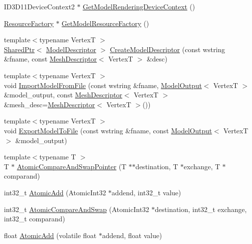 \begin{DoxyCompactItemize}
\item 
I\+D3\+D11\+Device\+Context2 $\ast$ \hyperlink{namespacemage_a1d373a08e09ec19944bf23feb4688b7e}{Get\+Model\+Rendering\+Device\+Context} ()
\item 
\hyperlink{classmage_1_1_resource_factory}{Resource\+Factory} $\ast$ \hyperlink{namespacemage_a51b4df46661a9038c0d2a14cb3fbe483}{Get\+Model\+Resource\+Factory} ()
\item 
{\footnotesize template$<$typename VertexT $>$ }\\\hyperlink{namespacemage_a1e01ae66713838a7a67d30e44c67703e}{Shared\+Ptr}$<$ \hyperlink{classmage_1_1_model_descriptor}{Model\+Descriptor} $>$ \hyperlink{namespacemage_a8cc26f80d3cb6f3d457bb06942880d84}{Create\+Model\+Descriptor} (const wstring \&fname, const \hyperlink{structmage_1_1_mesh_descriptor}{Mesh\+Descriptor}$<$ VertexT $>$ \&desc)
\item 
{\footnotesize template$<$typename VertexT $>$ }\\void \hyperlink{namespacemage_a3b43f166d61c14d680b28614da17ac2b}{Import\+Model\+From\+File} (const wstring \&fname, \hyperlink{structmage_1_1_model_output}{Model\+Output}$<$ VertexT $>$ \&model\+\_\+output, const \hyperlink{structmage_1_1_mesh_descriptor}{Mesh\+Descriptor}$<$ VertexT $>$ \&mesh\+\_\+desc=\hyperlink{structmage_1_1_mesh_descriptor}{Mesh\+Descriptor}$<$ VertexT $>$())
\item 
{\footnotesize template$<$typename VertexT $>$ }\\void \hyperlink{namespacemage_a3cb120c707ba8db950082a33d76b3ec8}{Export\+Model\+To\+File} (const wstring \&fname, const \hyperlink{structmage_1_1_model_output}{Model\+Output}$<$ VertexT $>$ \&model\+\_\+output)
\item 
{\footnotesize template$<$typename T $>$ }\\T $\ast$ \hyperlink{namespacemage_aed89242e67231f3ddef77bdc63b32b6c}{Atomic\+Compare\+And\+Swap\+Pointer} (T $\ast$$\ast$destination, T $\ast$exchange, T $\ast$comparand)
\item 
int32\+\_\+t \hyperlink{namespacemage_ad397e742fa7e3532686fd46bb50e8166}{Atomic\+Add} (Atomic\+Int32 $\ast$addend, int32\+\_\+t value)
\item 
int32\+\_\+t \hyperlink{namespacemage_a03da57cfa5ba14d4aa0472ae49ec5c7e}{Atomic\+Compare\+And\+Swap} (Atomic\+Int32 $\ast$destination, int32\+\_\+t exchange, int32\+\_\+t comparand)
\item 
float \hyperlink{namespacemage_a0de5ff6241a0474f4572c7c3ba342098}{Atomic\+Add} (volatile float $\ast$addend, float value)
$$
\end{DoxyCompactItemize}
